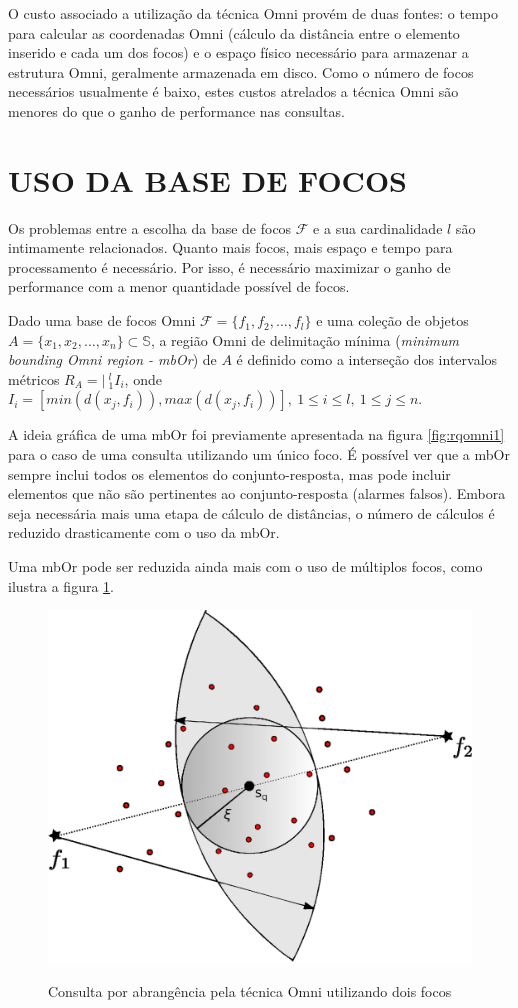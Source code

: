 O custo associado a utilização da técnica Omni provém de duas fontes: o tempo para calcular as coordenadas Omni (cálculo da distância
entre o elemento inserido e cada um dos focos) e o espaço físico necessário para armazenar a estrutura Omni, geralmente armazenada em disco.
Como o número de focos necessários usualmente é baixo, estes custos atrelados a técnica Omni são menores do que o ganho
de performance nas consultas.

\section{USO DA BASE DE FOCOS}
Os problemas entre a escolha da base de focos $\mathscr{F}$ e a sua cardinalidade $l$ são intimamente relacionados. Quanto
mais focos, mais espaço e tempo para processamento é necessário. Por isso, é necessário maximizar o ganho de performance com
a menor quantidade possível de focos.

\begin{mydef}
 Dado uma base de focos Omni $\mathscr{F} = \{f_1, f_2, ..., f_l\}$ e uma coleção de objetos $A = \{x_1,x_2,...,x_n\} \subset \mathbb{S}$, a
 região Omni de delimitação mínima (\textit{minimum bounding Omni region - mbOr}) de $A$ é definido como a interseção
 dos intervalos métricos $R_A = |\  ^{l}_{1}I_i$, onde $I_i = [min(d(x_j, f_i)), max(d(x_j, f_i))],\ 1\leq i \leq l,\ 1 \leq j \leq n$. 
\end{mydef}

A ideia gráfica de uma mbOr foi previamente apresentada na figura \ref{fig:rqomni1} para o caso de uma consulta utilizando um único foco.
É possível ver que a mbOr sempre inclui todos os elementos do conjunto-resposta, mas pode incluir elementos que não são pertinentes
ao conjunto-resposta (alarmes falsos). Embora seja necessária mais uma etapa de cálculo de distâncias, o número de cálculos é
reduzido drasticamente com o uso da mbOr.\par

Uma mbOr pode ser reduzida ainda mais com o uso de múltiplos focos, como ilustra a figura \ref{fig:rqomni2}.

\begin{figure}[H]
\centering
\caption{Consulta por abrangência pela técnica Omni utilizando dois focos}
\includegraphics[width=.4\textwidth]{dados/figuras/rg_omni_2.eps}
\label{fig:rqomni2}
\end{figure}
								
